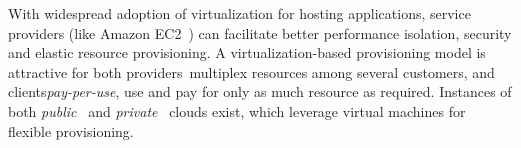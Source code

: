 

With widespread adoption of virtualization for hosting applications,
service providers (like Amazon EC2~\cite{ec2}) can facilitate better 
performance isolation, security and elastic resource provisioning.
A virtualization-based provisioning model is attractive for both 
providers~\cite{ec2}\textemdash{}multiplex resources among several customers, and 
clients\textemdash{}\textit{pay-per-use}, use and pay for only as much resource 
as required. Instances of both \emph{public}~\cite{ec2} and 
\emph{private}~\cite{ubuntu-private-cloud} clouds exist, 
which leverage virtual machines for flexible provisioning.



